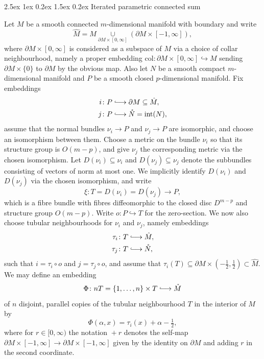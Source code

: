 \documentclass[reqno,a4paper]{article}
\makeatletter
\numberwithin{equation}{section}
\theoremstyle{italicised}
\theoremstyle{upright}
\theoremstyle{italicised-restate}
\renewcommand*{\section}{\@startsection{section}{1}{\z@}%
	{2.5ex \@plus 1ex \@minus 0.2ex}%
	{1.5ex \@plus 0.2ex}%
	{\normalfont\large\bfseries}}
\newcommand{\lhto}{\lhook\joinrel\longrightarrow}
\makeatother
\begin{document}
\tableofcontents


\section{Iterated parametric connected sum}\label{s:param-connected-sum}


Let $M$ be a smooth connected $m$-dimensional manifold with boundary and write
\[
\hat{M} = M \underset{\partial M \times [0,\infty]}{\cup} (\partial M \times [-1,\infty]),
\]
where $\partial M \times [0,\infty]$ is considered as a subspace of $M$ via a choice of collar neighbourhood, namely a proper embedding $\mathrm{col} \colon \partial M \times [0,\infty] \hookrightarrow M$ sending $\partial M \times \{0\}$ to $\partial M$ by the obvious map. Also let $N$ be a smooth compact $m$-dimensional manifold and $P$ be a smooth closed $p$-dimensional manifold. Fix embeddings
\begin{align*}
i \colon P &\lhto \partial M \subseteq \hat{M}, \\
j \colon P &\lhto \mathring{N} = \mathrm{int}(N),
\end{align*}
assume that the normal bundles $\nu_i \to P$ and $\nu_j \to P$ are isomorphic, and choose an isomorphism between them. Choose a metric on the bundle $\nu_i$ so that its structure group is $O(m-p)$, and give $\nu_j$ the corresponding metric via the chosen isomorphism. Let $D(\nu_i) \subseteq \nu_i$ and $D(\nu_j) \subseteq \nu_j$ denote the subbundles consisting of vectors of norm at most one. We implicitly identify $D(\nu_i)$ and $D(\nu_j)$ via the chosen isomorphism, and write
\[
\xi \colon T = D(\nu_i) = D(\nu_j) \longrightarrow P,
\]
which is a fibre bundle with fibres diffeomorphic to the closed disc $D^{m-p}$ and structure group $O(m-p)$. Write $o \colon P \hookrightarrow T$ for the zero-section. We now also choose tubular neighbourhoods for $\nu_i$ and $\nu_j$, namely embeddings
\begin{align*}
\tau_i \colon T &\lhto \hat{M}, \\
\tau_j \colon T &\lhto \mathring{N},
\end{align*}
such that $i = \tau_i \circ o$ and $j = \tau_j \circ o$, and assume that $\tau_i(T) \subseteq \partial M \times (-\tfrac12,\tfrac12) \subset \hat{M}$. We may define an embedding
\[
\Phi \colon nT = \{ 1,\ldots, n \} \times T \lhto \mathring{M}
\]
of $n$ disjoint, parallel copies of the tubular neighbourhood $T$ in the interior of $M$ by
\[
\Phi(\alpha,x) = \tau_i(x) + \alpha - \tfrac12,
\]
where for $r \in [0,\infty)$ the notation $\! {} + r$ denotes the self-map $\partial M \times [-1,\infty] \to \partial M \times [-1,\infty]$ given by the identity on $\partial M$ and adding $r$ in the second coordinate.
\end{document}
